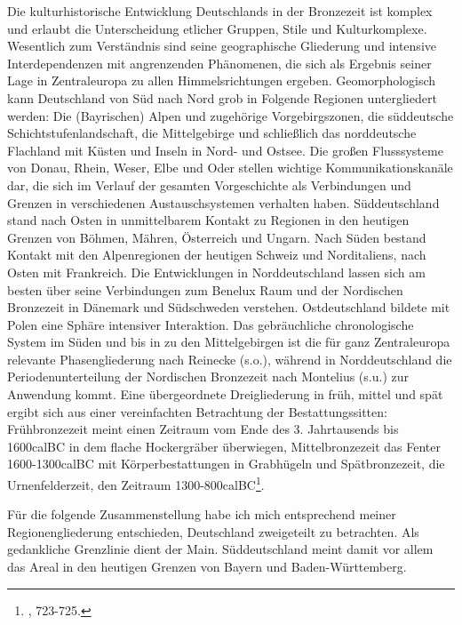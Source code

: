 \documentclass[openany,twoside,twocolumn]{book}
\let\rmarkdownfootnote\footnote%
\def\footnote{\protect\rmarkdownfootnote}
\begin{document}
Die kulturhistorische Entwicklung Deutschlands in der Bronzezeit ist
komplex und erlaubt die Unterscheidung etlicher Gruppen, Stile und
Kulturkomplexe. Wesentlich zum Verständnis sind seine geographische
Gliederung und intensive Interdependenzen mit angrenzenden Phänomenen,
die sich als Ergebnis seiner Lage in Zentraleuropa zu allen
Himmelsrichtungen ergeben. Geomorphologisch kann Deutschland von Süd
nach Nord grob in Folgende Regionen untergliedert werden: Die
(Bayrischen) Alpen und zugehörige Vorgebirgszonen, die süddeutsche
Schichtstufenlandschaft, die Mittelgebirge und schließlich das
norddeutsche Flachland mit Küsten und Inseln in Nord- und Ostsee. Die
großen Flusssysteme von Donau, Rhein, Weser, Elbe und Oder stellen
wichtige Kommunikationskanäle dar, die sich im Verlauf der gesamten
Vorgeschichte als Verbindungen und Grenzen in verschiedenen
Austauschsystemen verhalten haben. Süddeutschland stand nach Osten in
unmittelbarem Kontakt zu Regionen in den heutigen Grenzen von Böhmen,
Mähren, Österreich und Ungarn. Nach Süden bestand Kontakt mit den
Alpenregionen der heutigen Schweiz und Norditaliens, nach Osten mit
Frankreich. Die Entwicklungen in Norddeutschland lassen sich am besten
über seine Verbindungen zum Benelux Raum und der Nordischen Bronzezeit
in Dänemark und Südschweden verstehen. Ostdeutschland bildete mit Polen
eine Sphäre intensiver Interaktion. Das gebräuchliche chronologische
System im Süden und bis in zu den Mittelgebirgen ist die für ganz
Zentraleuropa relevante Phasengliederung nach Reinecke (s.o.), während
in Norddeutschland die Periodenunterteilung der Nordischen Bronzezeit
nach Montelius (s.u.) zur Anwendung kommt. Eine übergeordnete
Dreigliederung in früh, mittel und spät ergibt sich aus einer
vereinfachten Betrachtung der Bestattungssitten: Frühbronzezeit meint
einen Zeitraum vom Ende des 3. Jahrtausends bis 1600calBC in dem flache
Hockergräber überwiegen, Mittelbronzezeit das Fenter 1600-1300calBC mit
Körperbestattungen in Grabhügeln und Spätbronzezeit, die
Urnenfelderzeit, den Zeitraum 1300-800calBC\footnote{\textcite{jockenhovel_germany_2013},
  723-725.}.

Für die folgende Zusammenstellung habe ich mich entsprechend meiner
Regionengliederung entschieden, Deutschland zweigeteilt zu betrachten.
Als gedankliche Grenzlinie dient der Main. Süddeutschland meint damit
vor allem das Areal in den heutigen Grenzen von Bayern und
Baden-Württemberg.
\end{document}

